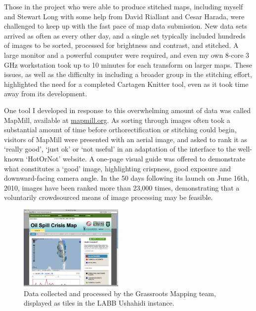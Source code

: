 \documentclass[11pt,oneside,notitlepage]{report}
\begin{document}
Those in the project who were able to produce stitched maps, including myself and Stewart Long with some help from David Riallant and Cesar Harada, were challenged to keep up with the fast pace of map data submission. New data sets arrived as often as every other day, and a single set typically included hundreds of images to be sorted, processed for brightness and contrast, and stitched. A large monitor and a powerful computer were required, and even my own 8-core 3 GHz workstation took up to 10 minutes for each transform on larger maps. These issues, as well as the difficulty in including a broader group in the stitching effort, highlighted the need for a completed Cartagen Knitter tool, even as it took time away from its development. 

One tool I developed in response to this overwhelming amount of data was called MapMill, available at \href{http://mapmill.org}{mapmill.org}. As sorting through images often took a substantial amount of time before orthorectification or stitching could begin, visitors of MapMill were presented with an aerial image, and asked to rank it as `really good', `just ok' or `not useful' in an adaptation of the interface to the well-known `HotOrNot' website. A one-page visual guide was offered to demonstrate what constitutes a `good' image, highlighting crispness, good exposure and downward-facing camera angle. In the 50 days following its launch on June 16th, 2010, images have been ranked more than 23,000 times, demonstrating that a voluntarily crowdsourced means of image processing may be feasible. 

\begin{figure}
	\begin{flushright}
		\includegraphics[width=0.45\textwidth]{images/labb-ushahidi.png}
		\caption{Data collected and processed by the Grassroots Mapping team, displayed as tiles in the LABB Ushahidi instance.}
	\end{flushright}
\end{figure}
\end{document}
